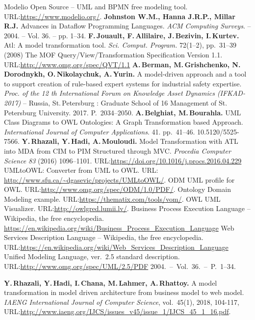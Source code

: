 \documentclass[runningheads]{llncs}
\begin{document}
\begin{thebibliography}{11}
 Modelio Open Source -- UML and BPMN free modeling tool. URL:\url{https://www.modelio.org/}.
 \textbf{Johnston W.M., Hanna J.R.P., Millar R.J.} Advances in Dataflow Programming Languages.
  \emph{ACM Computing Surveys}. -- 2004. -- Vol. 36. -- pp. 1--34.
 \textbf{F.\,Jouault, F.\,Allilaire, J.\,Bezivin, I.\,Kurtev.} Atl: A model transformation tool. \emph{Sci. Comput. Program.} 72(1--2), pp.~31--39 (2008)
 The MOF Query/View/Transformation Specification Version 1.1. URL:\url{http://www.omg.org/spec/QVT/1.1}
 \textbf{A.\,Berman, M.\,Grishchenko, N.\,Dorodnykh, O.\,Nikolaychuk, A.\,Yurin.} A model-driven approach and a tool to support creation of rule-based expert systems for industrial safety expertise. \emph{Proc. of the 12 th International Forum on Knowledge Asset Dynamics (IFKAD-2017)} -- Russia, St.\,Petersburg : Graduate School of 16 Management of St.\,Petersburg University.  2017.  P.~2034--2050.
 \textbf{A.\,Belghiat, M.\,Bourahla.} UML Class Diagrams to OWL Ontologies: A Graph Transformation based Approach. \emph{International Journal of Computer Applications}. 41. pp.~41--46. 10.5120/5525-7566.
\textbf{Y.\,Rhazali, Y.\,Hadi, A.\,Mouloudi.} Model Transformation with ATL into MDA from CIM to PIM Structured through MVC. \emph{Procedia Computer Science 83} (2016) 1096–1101. URL:\url{https://doi.org/10.1016/j.procs.2016.04.229}
 UMLtoOWL: Converter from UML to OWL. URL: \url{http://www.sfu.ca/~dgasevic/projects/UMLtoOWL/}.
 ODM UML profile for OWL. URL:\url{http://www.omg.org/spec/ODM/1.0/PDF/}.
 Ontology Domain Modeling example. URL:\url{https://thematix.com/tools/vom/}.
 OWL UML Visualizer. URL:\url{http://owlgred.lumii.lv/}.
 Business Process Execution Language -- Wikipedia, the free encyclopedia. \url{https://en.wikipedia.org/wiki/Business_Process_Execution_Language}
 Web Services Description Language -- Wikipedia, the free encyclopedia.  URL:\url{https://en.wikipedia.org/wiki/Web_Services_Description_Language}
 Unified Modeling Language, ver.~2.5 standard description. URL:\url{http://www.omg.org/spec/UML/2.5/PDF}
  2004.~--~Vol.~36.~--~P.~1--34.

\textbf{Y.\,Rhazali, Y.\,Hadi, I.\,Chana, M.\,Lahmer, A.\,Rhattoy.} A model
transformation in model driven architecture from business model to web
model. \emph{IAENG International Journal of Computer Science}, vol.~45(1), 2018, 104-117, URL:\url{http://www.iaeng.org/IJCS/issues_v45/issue_1/IJCS_45_1_16.pdf}.


\end{thebibliography}
\end{document}
